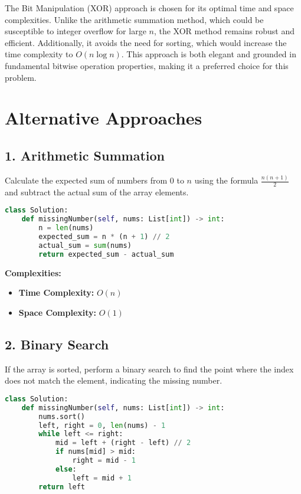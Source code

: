 The Bit Manipulation (XOR) approach is chosen for its optimal time and space complexities. Unlike the arithmetic summation method, which could be susceptible to integer overflow for large \(n\), the XOR method remains robust and efficient. Additionally, it avoids the need for sorting, which would increase the time complexity to \(O(n \log n)\). This approach is both elegant and grounded in fundamental bitwise operation properties, making it a preferred choice for this problem.

\section*{Alternative Approaches}

\subsection*{1. Arithmetic Summation}
Calculate the expected sum of numbers from \(0\) to \(n\) using the formula \(\frac{n(n+1)}{2}\) and subtract the actual sum of the array elements.

\begin{lstlisting}[language=Python]
class Solution:
    def missingNumber(self, nums: List[int]) -> int:
        n = len(nums)
        expected_sum = n * (n + 1) // 2
        actual_sum = sum(nums)
        return expected_sum - actual_sum
\end{lstlisting}

\textbf{Complexities:}
\begin{itemize}
    \item \textbf{Time Complexity:} \(O(n)\)
    \item \textbf{Space Complexity:} \(O(1)\)
\end{itemize}

\subsection*{2. Binary Search}
If the array is sorted, perform a binary search to find the point where the index does not match the element, indicating the missing number.

\begin{lstlisting}[language=Python]
class Solution:
    def missingNumber(self, nums: List[int]) -> int:
        nums.sort()
        left, right = 0, len(nums) - 1
        while left <= right:
            mid = left + (right - left) // 2
            if nums[mid] > mid:
                right = mid - 1
            else:
                left = mid + 1
        return left
\end{lstlisting}

